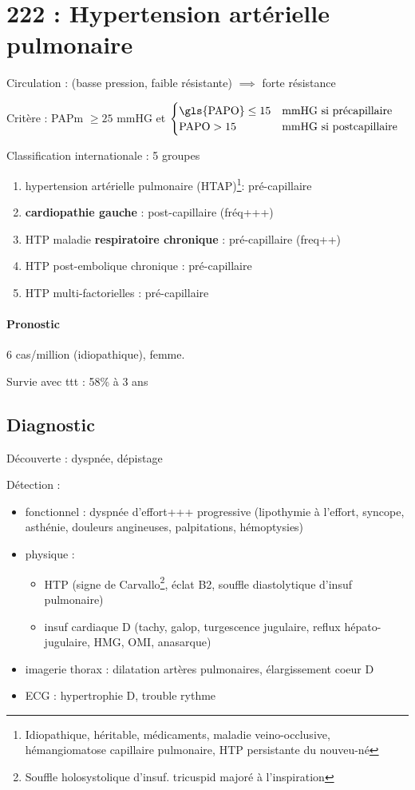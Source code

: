 \documentclass{article}
\begin{document}
\section{222 : Hypertension artérielle pulmonaire}%
\label{sec:hypertension_arterielle_pulmonaire}

Circulation : (basse pression, faible résistante) $\implies$ forte résistance

Critère : \gls{PAPm} $\ge 25$ mmHG et
$\begin{cases}
  \text{\gls{PAPO}} \le 15 & \text{mmHG si précapillaire} \\
  \text{PAPO} > 15 & \text{mmHG si postcapillaire}
  \end{cases}  $

Classification internationale : 5 groupes
\begin{enumerate}
\item hypertension artérielle pulmonaire (HTAP)\footnote{Idiopathique,
    héritable, médicaments, maladie veino-occlusive, hémangiomatose capillaire
    pulmonaire, HTP persistante du nouveu-né}: pré-capillaire
\item \textbf{cardiopathie gauche}  : post-capillaire (fréq+++)
\item HTP maladie \textbf{respiratoire chronique}  : pré-capillaire (freq++)
\item HTP post-embolique chronique : pré-capillaire
\item HTP multi-factorielles : pré-capillaire
\end{enumerate}

\paragraph{Pronostic}
6 cas/million (idiopathique), femme.

Survie avec ttt : 58\% à 3 ans

\subsection{Diagnostic}
Découverte : dyspnée, dépistage

Détection :
\begin{itemize}
\item fonctionnel : dyspnée d'effort+++ progressive (lipothymie à l'effort,
  syncope, asthénie, douleurs angineuses, palpitations, hémoptysies)
\item physique : 
  \begin{itemize}
  \item HTP (signe de Carvallo\footnote{Souffle holosystolique
    d'insuf. tricuspid majoré à l'inspiration}, éclat B2, souffle diastolytique
  d'insuf pulmonaire)
  \item insuf cardiaque D (tachy, galop, turgescence jugulaire, reflux
  hépato-jugulaire, HMG, OMI, anasarque)
  \end{itemize}
\item imagerie thorax : dilatation artères pulmonaires, élargissement coeur D
\item ECG : hypertrophie D, trouble rythme
\end{itemize}
\end{document}
